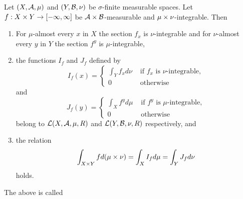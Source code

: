 \begin{prop}
Let
$(X, \mathcal{A}, \mu)$ and
$(Y, \mathcal{B}, \nu)$ be
$\sigma$-finite measurable spaces.
Let $f: X \times Y \to [-\infty,\infty]$ be
$\mathcal{A} \times \mathcal{B}$-measurable
and $\mu\times\nu$-integrable.
Then
  \begin{enumerate}
    \item
      For $\mu$-almost every
      $x$ in $X$ the section
      $f_x$ is $\nu$-integrable
      and for $\nu$-almost every
      $y$ in $Y$ the section $f^y$
      is $\mu$-integrable,
    \item
      the functions $I_f$ and $J_f$
      defined by
      \[
        I_f(x) = \begin{cases}
          \int_{Y} f_x d\nu &\text{ if }
          f_x \text{ is } \nu\text{-integrable}, \\
          0 & \text{ otherwise}
        \end{cases}
      \]
      and
      \[
        J_f(y) = \begin{cases}
          \int_{X} f^y d\mu &\text{ if }
          f^y \text{ is } \mu\text{-integrable}, \\
          0 & \text{ otherwise}
        \end{cases}
      \]
      belong to
      $\mathcal{L}(X, \mathcal{A}, \mu, R)$
      and
      $\mathcal{L}(Y, \mathcal{B}, \nu, R)$
      respectively, and
    \item
      the relation
      \[
        \int_{X \times Y} f d(\mu \times \nu)
        = \int_{X} I_f d\mu = \int_{Y} J_f d\nu
      \]
      holds.
  \end{enumerate}
\end{prop}

The above is called 
\strats
